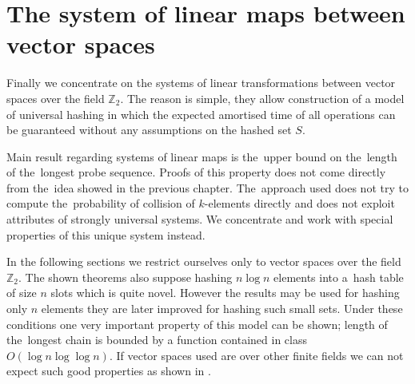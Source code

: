 \chapter{The system of linear maps between vector spaces}
Finally we concentrate on the systems of linear transformations between vector spaces over the field $\mathbb{Z}_2$. The reason is simple, they allow construction of a model of universal hashing in which the expected amortised time of all operations can be guaranteed without any assumptions on the hashed set $S$. 

Main result regarding systems of linear maps is the~upper bound on the~length of the~longest probe sequence. Proofs of this property does not come directly from the~idea showed in the previous chapter. The~approach used does not try to compute the~probability of collision of $k$-elements directly and does not exploit attributes of strongly universal systems. We concentrate and work with special properties of this unique system instead.

In the following sections we restrict ourselves only to vector spaces over the field $\mathbb{Z}_2$. The shown theorems also suppose hashing $n \log n$ elements into a~hash table of size $n$ slots which is quite novel. However the results may be used for hashing only $n$ elements they are later improved for hashing such small sets. Under these conditions one very important property of this model can be shown; length of the~longest chain is bounded by a function contained in class $O(\log n \log \log n)$. If vector spaces used are over other finite fields we can not expect such good properties as shown in \cite{DBLP:journals/jacm/AlonDMPT99}.




